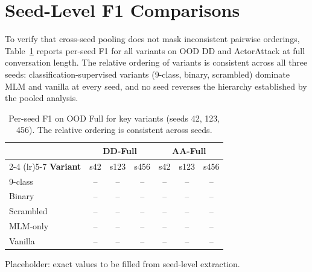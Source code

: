 \section{Seed-Level F1 Comparisons}
\label{app:seed_level}

To verify that cross-seed pooling does not mask inconsistent pairwise orderings, Table~\ref{tab:seed_level} reports per-seed F1 for all variants on OOD DD and ActorAttack at full conversation length. The relative ordering of variants is consistent across all three seeds: classification-supervised variants (9-class, binary, scrambled) dominate MLM and vanilla at every seed, and no seed reverses the hierarchy established by the pooled analysis.

% 
\begin{table}[h]
\centering
\small
\caption{Per-seed F1 on OOD Full for key variants (seeds 42, 123, 456). The relative ordering is consistent across seeds.}
\label{tab:seed_level}
\begin{tabular}{@{}lcccccc@{}}
\toprule
& \multicolumn{3}{c}{DD-Full} & \multicolumn{3}{c}{AA-Full} \\
\cmidrule(lr){2-4} \cmidrule(lr){5-7}
\textbf{Variant} & s42 & s123 & s456 & s42 & s123 & s456 \\
\midrule
9-class & -- & -- & -- & -- & -- & -- \\
Binary & -- & -- & -- & -- & -- & -- \\
Scrambled & -- & -- & -- & -- & -- & -- \\
MLM-only & -- & -- & -- & -- & -- & -- \\
Vanilla & -- & -- & -- & -- & -- & -- \\
\bottomrule
\end{tabular}
\vspace{-2pt}
{\footnotesize Placeholder: exact values to be filled from seed-level extraction.}
\end{table}
